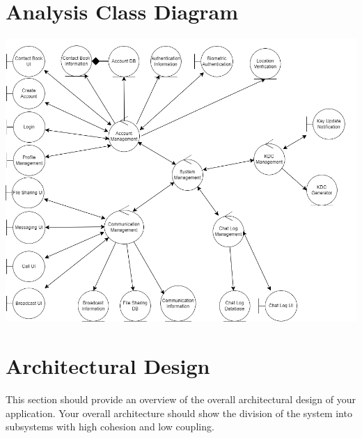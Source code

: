 \documentclass[]{article}
\begin{document}

\section{Analysis Class Diagram}
\label{sec:analysis_class_diagram}
\includegraphics[width=\textwidth]{../images/ACD.png}



\section{Architectural Design}
\label{sec:architectural_design}
This section should provide an overview of the overall architectural design of your application. Your overall architecture should show the division of the system into subsystems with high cohesion and low coupling.
\end{document}
